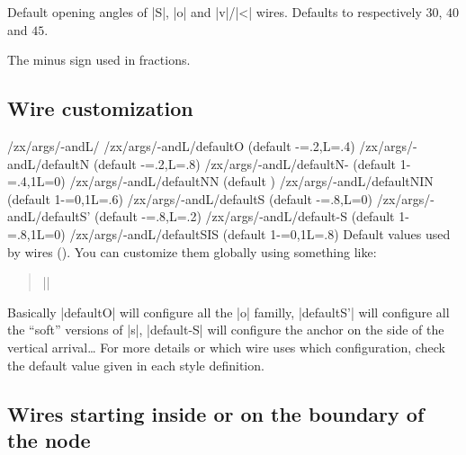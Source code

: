 \documentclass[a4paper]{ltxdoc}
\begin{document}
{\begin{pgfmanualentry}
  \extractcommand\zxDefaultSoftAngleS{}\@@
  \extractcommand\zxDefaultSoftAngleO{}\@@
  \extractcommand\zxDefaultSoftAngleChevron{}\@@
  \pgfmanualbody
  Default opening angles of |S|, |o| and |v|/|<| wires. Defaults to respectively $30$, $40$ and $45$.
\end{pgfmanualentry}

\begin{command}{\zxMinus{}}
  The minus sign used in fractions.
\end{command}

\subsection{Wire customization}\label{subsec:wirecustom}

\begin{pgfmanualentry}
  \makeatletter
  \def\extrakeytext{style, }
  \extractkey/zx/args/-andL/\@nil%
  \extractkey/zx/args/-andL/defaultO (default {-=.2,L=.4})\@nil%
  \extractkey/zx/args/-andL/defaultN (default {-=.2,L=.8})\@nil%
  \extractkey/zx/args/-andL/defaultN- (default {1-=.4,1L=0})\@nil%
  \extractkey/zx/args/-andL/defaultNN (default {})\@nil%
  \extractkey/zx/args/-andL/defaultNIN (default {1-=0,1L=.6})\@nil%
  \extractkey/zx/args/-andL/defaultS (default {-=.8,L=0})\@nil%
  \extractkey/zx/args/-andL/defaultS' (default {-=.8,L=.2})\@nil%
  \extractkey/zx/args/-andL/default-S (default {1-=.8,1L=0})\@nil%
  \extractkey/zx/args/-andL/defaultSIS (default {1-=0,1L=.8})\@nil%
  \makeatother
  \pgfmanualbody
  Default values used by wires (). You can customize them globally using something like:
  \begin{verse}
    ||
   \end{verse}
   Basically |defaultO| will configure all the |o| familly, |defaultS'| will configure all the ``soft'' versions of |s|, |default-S| will configure the anchor on the side of the vertical arrival\dots{} For more details or which wire uses which configuration, check the default value given in each style definition.
\end{pgfmanualentry}

\subsection{Wires starting inside or on the boundary of the node}\label{subsec:wiresInsideOutside}

}
\end{document}
